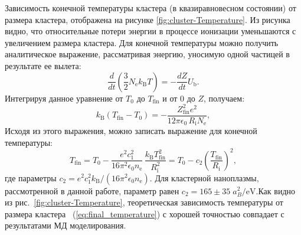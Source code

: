 Зависимость конечной температуры кластера (в квазиравновесном состоянии) от размера кластера, отображена на рисунке \ref{fig:cluster-Temperature}. Из рисунка видно, что относительные потери энергии в процессе ионизации уменьшаются с увеличением размера кластера. Для конечной температуры можно получить аналитическое выражение, рассматривая энергию, уносимую одной частицей в результате ее вылета:
\begin{equation}\label{eq:Cons-law}
\frac{d}{dt}\left(\frac{3}{2} N_\mathrm{e} k^{}_\mathrm{B} T\right) = - \frac{dZ}{dt} U_\mathrm{b}.
\end{equation}
Интегрируя данное уравнение от $T_0$ до $T_\text{fin}$ и от 0 до $Z$, получаем:
\begin{equation}\label{eq:main_after_integration}
k^{}_\mathrm{B} (T_\mathrm{fin} - T_0)
= -\frac{Z_\mathrm{fin}^2 e^2}{12\pi\epsilon_0\,R_\mathrm{i}N_\mathrm{e}},
\end{equation}
Исходя из этого выражения, можно записать выражение для конечной температуры:
\begin{equation}\label{eq:final_temperature}
T_\mathrm{fin}
= T_0 - \frac{e^2 c_1^2}{16 \pi^2 \epsilon_0  n_\mathrm{e}}\,
\frac{k^{}_\mathrm{B} T_\mathrm{fin}^2}{R_\mathrm{i}^2}
= T_0 - c_2 \left( \frac{T_\mathrm{fin}}{R_\mathrm{i}} \right)^2,
\end{equation}
где параметры $c_2 = e^2 c_1^2 k^{}_\mathrm{B}/(16 \pi^2 \epsilon_0  n_\mathrm{e})$. Для кластерной наноплазмы, рассмотренной в данной работе, параметр равен $c_2 = 165 \pm 35\; a_B^2/\mathrm{eV}$.Как видно из рис.~\ref{fig:cluster-Temperature}, теоретическая зависимость температуры от размера кластера ~(\ref{eq:final_temperature}) с хорошей точностью совпадает с результатами МД моделирования.


